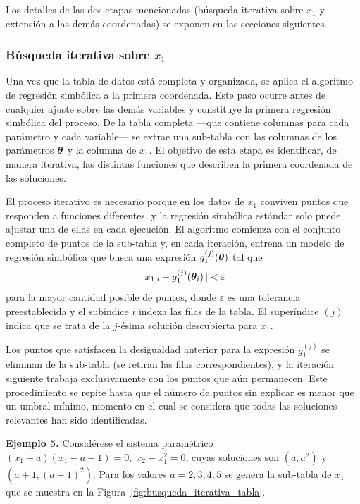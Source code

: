 \documentclass{article} \usepackage[utf8]{inputenc} \usepackage[spanish]{babel} \spanishdecimal{.} \usepackage{amsmath, amssymb, amsthm} \usepackage{bm} \usepackage{float} \usepackage{longtable} \usepackage[hidelinks]{hyperref}
\begin{document}
Los detalles de las dos etapas mencionadas (búsqueda iterativa sobre
\(x_1\) y extensión a las demás coordenadas) se exponen en las
secciones siguientes.

\subsubsection{Búsqueda iterativa sobre \(x_1\)}
\label{sec:busqueda_ancla}

Una vez que la tabla de datos está completa y organizada, se aplica
el algoritmo de regresión simbólica a la primera coordenada. Este
paso ocurre antes de cualquier ajuste sobre las demás variables y
constituye la primera regresión simbólica del proceso. De la tabla
completa —que contiene columnas para cada parámetro y cada
variable— se extrae una sub-tabla con las columnas de los parámetros
\(\boldsymbol{\theta}\) y la columna de \(x_1\). El objetivo de esta etapa es
identificar, de manera iterativa, las distintas funciones que
describen la primera coordenada de las soluciones.

El proceso iterativo es necesario porque en los datos de \(x_1\)
conviven puntos que responden a funciones diferentes, y la regresión
simbólica estándar solo puede ajustar una de ellas en cada
ejecución. El algoritmo comienza con el conjunto completo de puntos
de la sub-tabla y, en cada iteración, entrena un modelo de regresión
simbólica que busca una expresión \(g_1^{(j)}(\boldsymbol{\theta})\) tal que
\[
|\,x_{1,i} - g_1^{(j)}(\boldsymbol{\theta}_i)\,| < \varepsilon
\]
para la mayor cantidad posible de puntos, donde \(\varepsilon\) es una
tolerancia preestablecida y el subíndice \(i\) indexa las filas de la
tabla. El superíndice \((j)\) indica que se trata de la \(j\)-ésima
solución descubierta para \(x_1\).

Los puntos que satisfacen la desigualdad anterior para la expresión
\(g_1^{(j)}\) se eliminan de la sub-tabla (se retiran las filas
correspondientes), y la iteración siguiente trabaja exclusivamente
con los puntos que aún permanecen. Este procedimiento se repite
hasta que el número de puntos sin explicar es menor que un umbral
mínimo, momento en el cual se considera que todas las soluciones
relevantes han sido identificadas.

\bigskip
\noindent\textbf{Ejemplo 5.} Considérese el sistema paramétrico
\((x_1 - a)(x_1 - a - 1) = 0,\; x_2 - x_1^2 = 0\), cuyas soluciones
son \((a, a^2)\) y \((a+1, (a+1)^2)\). Para los valores
\(a = 2, 3, 4, 5\) se genera la sub-tabla de \(x_1\) que se muestra
en la Figura~\ref{fig:busqueda_iterativa_tabla}.
\end{document}

